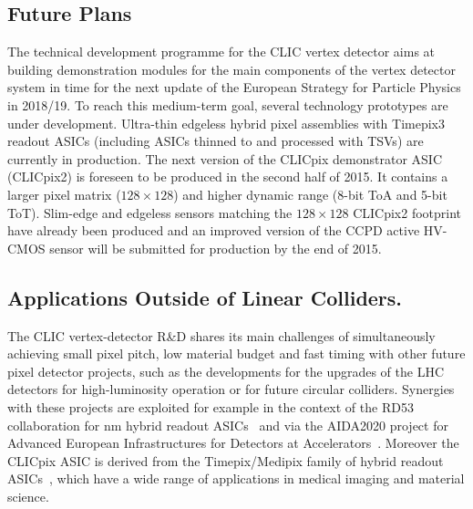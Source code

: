 \subsection{Future Plans}
The technical development programme for the CLIC vertex detector aims at building
demonstration modules for the main components of the vertex detector system
in time for the next update of the European Strategy
for Particle Physics in 2018/19. To reach this medium-term goal, several technology prototypes
are under development.
Ultra-thin edgeless hybrid pixel assemblies with Timepix3 readout ASICs (including ASICs thinned to \unit[50]{\micron}
and processed with TSVs) are currently in production.
The next version of the CLICpix demonstrator
ASIC (CLICpix2) is foreseen to be produced in the second half of 2015. It contains a larger
pixel matrix ($128\times 128$) and higher dynamic range (8-bit ToA and 5-bit ToT).
Slim-edge and edgeless sensors matching the $128\times 128$ CLICpix2 footprint have already been produced and an
improved version of the CCPD active HV-CMOS sensor will be submitted for production by the end of 2015.

\subsection{Applications Outside of Linear Colliders.}
The CLIC vertex-detector R\&D shares its main challenges of simultaneously achieving small pixel pitch,
low material budget and fast timing with other future pixel detector projects, such as the developments for
the upgrades of the LHC detectors for high-luminosity operation or for future circular colliders.
Synergies with these projects are exploited for example in the context of the RD53 collaboration for \unit[65]{nm} hybrid readout
ASICs~\cite{RD53} and via the AIDA2020 project for Advanced European Infrastructures for Detectors at
Accelerators~\cite{AIDA2020}.
Moreover the CLICpix ASIC is derived from the
Timepix/Medipix family of hybrid readout ASICs~\cite{medipix-collaboration}, which have a wide range of applications in
medical imaging and material science.

